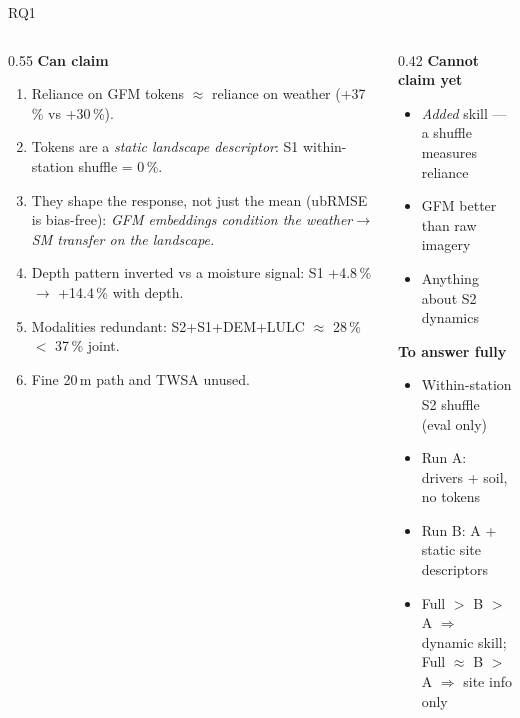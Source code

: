 \documentclass[aspectratio=169,10pt]{beamer}
\begin{document}
\begin{frame}{RQ1}
\footnotesize
\begin{columns}[T,onlytextwidth]
\begin{column}{0.55\textwidth}
\textbf{Can claim}
\begin{enumerate}
\item Reliance on GFM tokens $\approx$ reliance on weather (+37\,\% vs +30\,\%).
\item Tokens are a \emph{static landscape descriptor}: S1 within-station shuffle = 0\,\%.
\item They shape the response, not just the mean (ubRMSE is bias-free): \emph{GFM embeddings condition the weather$\rightarrow$SM transfer on the landscape.}
\item Depth pattern inverted vs a moisture signal: S1 +4.8\,\% $\rightarrow$ +14.4\,\% with depth.
\item Modalities redundant: S2+S1+DEM+LULC $\approx$ 28\,\% $<$ 37\,\% joint.
\item Fine 20\,m path and TWSA unused.
\end{enumerate}
\end{column}
\begin{column}{0.42\textwidth}
\textbf{Cannot claim yet}
\begin{itemize}
\item \emph{Added} skill --- a shuffle measures reliance
\item GFM better than raw imagery
\item Anything about S2 dynamics
\end{itemize}
\textbf{To answer fully}
\begin{itemize}
\item Within-station S2 shuffle (eval only)
\item Run A: drivers + soil, no tokens
\item Run B: A + static site descriptors
\item Full $>$ B $>$ A $\Rightarrow$ dynamic skill;\\ Full $\approx$ B $>$ A $\Rightarrow$ site info only
\end{itemize}
\end{column}
\end{columns}
\end{frame}
\end{document}
